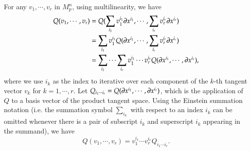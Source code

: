 \documentclass[11pt, a4paper]{book}
\begin{document}
For any $v_1, \cdots, v_r$ in $M_p^n$, using multilinearity, we have
\begin{equation}
  \begin{aligned}
    Q(v_1,\cdots,v_r) &= Q(\sum_{i_1}v_1^{i_1} \boldsymbol{\partial}x^{i_1}, \cdots,
    \sum_{i_r}v_r^{i_r} \boldsymbol{\partial}x^{i_r}) \\
    &= \sum_{i_1}v_1^{i_1} Q(\boldsymbol{\partial}x^{i_1},\cdots,\sum_{i_r}v_r^{i_r}\boldsymbol{\partial}x^{i_r}) \\
    &= \sum_{i_1}\cdots\sum_{i_r}v_1^{i_1}\cdots v_r^{i_r}
    Q(\boldsymbol{\partial}x^{i_1},\cdots,\boldsymbol{\partial}x^{i_r}),
  \end{aligned}
\end{equation}
where we use $i_k$ as the index to iterative over each component of the $k$-th tangent
vector $v_k$ for $k=1,\cdots,r$. Let
$Q_{i_1\cdots i_r}= Q(\boldsymbol{\partial}x^{i_1},\cdots,\boldsymbol{\partial}x^{i_r})$, which is the
application of $Q$ to a basis vector of the product tangent space. Using the Einstein
summation notation (i.e. the summation symbol $\sum_{i_k}$ with respect to an index $i_k$
can be omitted whenever there is a pair of subscript $i_k$ and superscript $i_k$ appearing
in the summand), we have
\begin{equation}
  \label{eq:covariant-tensor-applied-to-r-vectors}
  Q(v_1,\cdots,v_r) = v_1^{i_1}\cdots v_r^{i_r} Q_{i_1 \cdots i_r}.
\end{equation}
\end{document}
